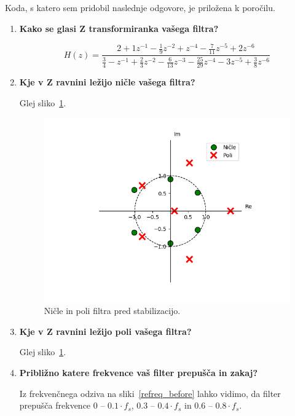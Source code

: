 \documentclass[a4paper,11pt]{article}
\begin{document}
Koda, s katero sem pridobil naslednje odgovore, je priložena k poročilu.
\begin{enumerate}
\item \textbf{Kako se glasi Z transformiranka vašega filtra?}

\[
H(z) = \frac{2 + 1z^{-1} - \frac{1}{9}z^{-2} + z^{-4} - \frac{7}{11}z^{-5} + 2z^{-6} }
		{\frac{3}{4} - z^{-1} + \frac{2}{3}z^{-2} - \frac{6}{13}z^{-3} - \frac{25}{29}z^{-4} - 3z^{-5} + \frac{3}{8}z^{-6}}
\]


\item \textbf{Kje v Z ravnini ležijo ničle vašega filtra?}

Glej sliko~\ref{nicle_before}.

\begin{figure}[htbp]
\begin{center}
\includegraphics[scale=0.6]{images/zplane_before.png}
\caption{Ničle in poli filtra pred stabilizacijo.}
\label{nicle_before}
\end{center}
\end{figure}


\item \textbf{Kje v Z ravnini ležijo poli vašega filtra?}

Glej sliko~\ref{nicle_before}.


\item \textbf{Približno katere frekvence vaš filter prepušča in zakaj?}

Iz frekvenčnega odziva na sliki~\ref{refreq_before} lahko vidimo, da filter prepušča frekvence $0$ -- $0.1 \cdot f_{s}$, $0.3$ -- $0.4\cdot f_{s}$ in $0.6$ -- $0.8 \cdot f_{s}$.


\end{enumerate}
\end{document}
